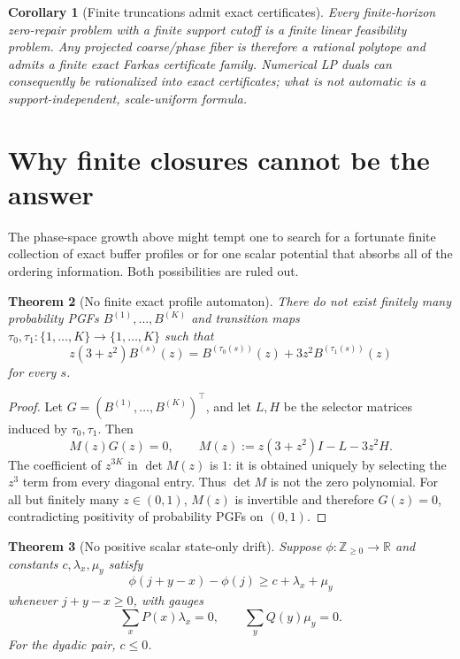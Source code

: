 \documentclass[11pt,a4paper]{article}
\newtheorem{theorem}{Theorem}[section]
\newtheorem{corollary}[theorem]{Corollary}
\theoremstyle{definition}
\theoremstyle{remark}
\newcommand{\R}{\mathbb R}
\newcommand{\Z}{\mathbb Z}
\begin{document}
\begin{corollary}[Finite truncations admit exact certificates]
Every finite-horizon zero-repair problem with a finite support cutoff is a
finite linear feasibility problem.  Any projected coarse/phase fiber is
therefore a rational polytope and admits a finite exact Farkas certificate
family.  Numerical LP duals can consequently be rationalized into exact
certificates; what is not automatic is a support-independent, scale-uniform
formula.
\end{corollary}

\section{Why finite closures cannot be the answer}
\label{sec:nogo}

The phase-space growth above might tempt one to search for a fortunate finite
collection of exact buffer profiles or for one scalar potential that absorbs
all of the ordering information.  Both possibilities are ruled out.

\begin{theorem}[No finite exact profile automaton]
\label{thm:nofiniteautomaton}
There do not exist finitely many probability PGFs
$B^{(1)},\ldots,B^{(K)}$ and transition maps
$\tau_0,\tau_1:\{1,\ldots,K\}\to\{1,\ldots,K\}$ such that
\begin{equation}
 z(3+z^2)B^{(s)}(z)
 =B^{(\tau_0(s))}(z)+3z^2B^{(\tau_1(s))}(z)
 \label{eq:finiteautomaton}
\end{equation}
for every $s$.
\end{theorem}

\begin{proof}
Let $G=(B^{(1)},\ldots,B^{(K)})^\top$, and let $L,H$ be the selector
matrices induced by $\tau_0,\tau_1$.  Then
\[
 M(z)G(z)=0,
 \qquad
 M(z):=z(3+z^2)I-L-3z^2H.
\]
The coefficient of $z^{3K}$ in $\det M(z)$ is $1$: it is obtained uniquely
by selecting the $z^3$ term from every diagonal entry.  Thus $\det M$ is not
the zero polynomial.  For all but finitely many $z\in(0,1)$, $M(z)$ is
invertible and therefore $G(z)=0$, contradicting positivity of probability
PGFs on $(0,1)$.
\end{proof}

\begin{theorem}[No positive scalar state-only drift]
\label{thm:noscalardrift}
Suppose $\phi:\Z_{\ge0}\to\R$ and constants $c,\lambda_x,\mu_y$ satisfy
\begin{equation}
 \phi(j+y-x)-\phi(j)
 \ge c+\lambda_x+\mu_y
 \label{eq:scalardrift}
\end{equation}
whenever $j+y-x\ge0$, with gauges
\[
 \sum_xP(x)\lambda_x=0,
 \qquad
 \sum_yQ(y)\mu_y=0.
\]
For the dyadic pair, $c\le0$.
\end{theorem}
\end{document}

